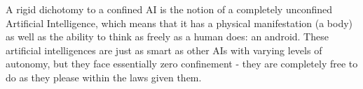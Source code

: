 A rigid dichotomy to a confined AI is the notion of a completely unconfined Artificial Intelligence, which means that it has a physical manifestation (a body) as well as the ability to think as freely as a human does: an android. These artificial intelligences are just as smart as other AIs with varying levels of autonomy, but they face essentially zero confinement - they are completely free to do as they please within the laws given them.